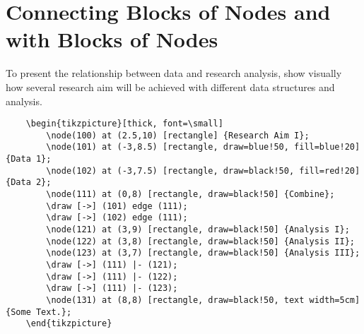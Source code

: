 \documentclass{article}
\begin{document}
\section{Connecting Blocks of Nodes and with Blocks of Nodes}

To present the relationship between data and research analysis, show visually how several research aim will be achieved with different data structures and analysis. 

\begin{verbatim}
    \begin{tikzpicture}[thick, font=\small]
        \node(100) at (2.5,10) [rectangle] {Research Aim I};
        \node(101) at (-3,8.5) [rectangle, draw=blue!50, fill=blue!20] {Data 1};
        \node(102) at (-3,7.5) [rectangle, draw=black!50, fill=red!20] {Data 2};
        \node(111) at (0,8) [rectangle, draw=black!50] {Combine};
        \draw [->] (101) edge (111);
        \draw [->] (102) edge (111);
        \node(121) at (3,9) [rectangle, draw=black!50] {Analysis I};
        \node(122) at (3,8) [rectangle, draw=black!50] {Analysis II};
        \node(123) at (3,7) [rectangle, draw=black!50] {Analysis III};
        \draw [->] (111) |- (121);
        \draw [->] (111) |- (122);
        \draw [->] (111) |- (123);
        \node(131) at (8,8) [rectangle, draw=black!50, text width=5cm] {Some Text.};
    \end{tikzpicture}    
\end{verbatim}
\end{document}
